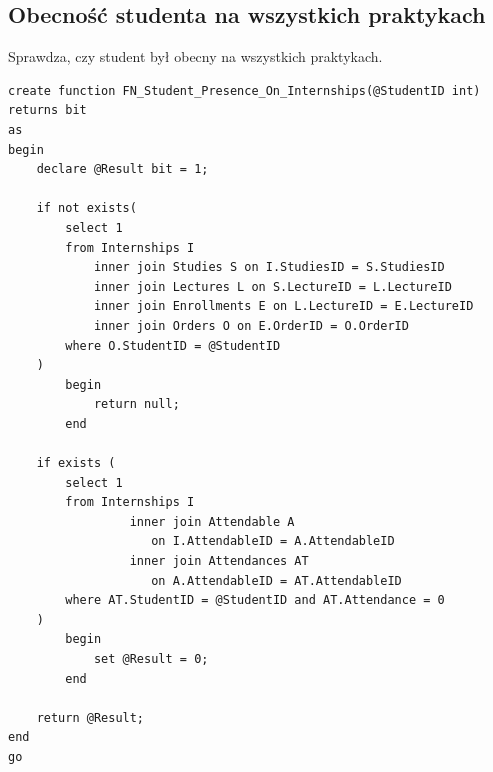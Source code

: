 \documentclass[11pt,a4paper]{article}
\begin{document}
\subsection{Obecność studenta na wszystkich praktykach}
Sprawdza, czy student był obecny na wszystkich praktykach.
\begin{Verbatim}[breaklines=true]
create function FN_Student_Presence_On_Internships(@StudentID int)
returns bit
as
begin
    declare @Result bit = 1;

    if not exists(
        select 1
        from Internships I
            inner join Studies S on I.StudiesID = S.StudiesID
            inner join Lectures L on S.LectureID = L.LectureID
            inner join Enrollments E on L.LectureID = E.LectureID
            inner join Orders O on E.OrderID = O.OrderID
        where O.StudentID = @StudentID
    )
        begin
            return null;
        end

    if exists (
        select 1
        from Internships I
                 inner join Attendable A 
                    on I.AttendableID = A.AttendableID
                 inner join Attendances AT 
                    on A.AttendableID = AT.AttendableID
        where AT.StudentID = @StudentID and AT.Attendance = 0
    )
        begin
            set @Result = 0;
        end

    return @Result;
end
go
\end{Verbatim}
\end{document}
